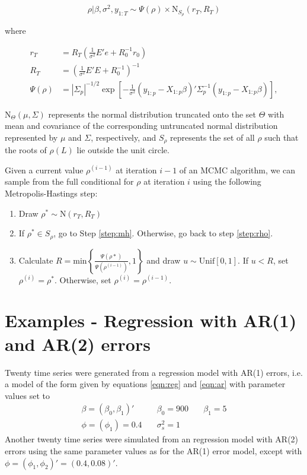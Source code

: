 \documentclass{article}
\begin{document}
\begin{equation}
\rho | \beta, \sigma^2, y_{1:T} \sim \Psi(\rho) \times \mbox{N}_{S_{\rho}}(r_T,R_T) \label{eqn:fullcondrho}
\end{equation}

\noindent where

\begin{align*}
r_T &= R_T(\frac{1}{\sigma^2}E'e + R_0^{-1}r_0) \\
R_T &= (\frac{1}{\sigma^2}E'E + R_0^{-1})^{-1} \\
\Psi(\rho) &= |\Sigma_p|^{-1/2} \exp\left[-\frac{1}{\sigma^2}(y_{1:p} - X_{1:p}\beta)'\Sigma_p^{-1}(y_{1:p} - X_{1:p}\beta)\right],
\end{align*}

\noindent $\mbox{N}_{\Theta}(\mu,\Sigma)$ represents the normal distribution truncated onto the set $\Theta$ with mean and covariance of the corresponding untruncated normal distribution represented by $\mu$ and $\Sigma$, respectively, and $S_{\rho}$ represents the set of all $\rho$ such that the roots of $\rho(L)$ lie outside the unit circle.

Given a current value $\rho^{(i-1)}$ at iteration $i-1$ of an MCMC algorithm, we can sample from the full conditional for $\rho$ at iteration $i$ using the following Metropolis-Hastings step:
\begin{enumerate}
\item Draw $\rho^* \sim \mbox{N}(r_T,R_T)$ \label{step:rho}
\item If $\rho^* \in S_{\rho}$, go to Step \ref{step:mh}. Otherwise, go back to step \ref{step:rho}.
\item Calculate $R = \mbox{min}\left\{\frac{\Psi(\rho*)}{\Psi(\rho^{(i-1)})}, 1\right\}$ and draw $u \sim \mbox{Unif}[0,1]$. If $u < R$, set $\rho^{(i)} = \rho^*$. Otherwise, set $\rho^{(i)} = \rho^{(i-1)}$. \label{step:mh}
\end{enumerate}

\section{Examples - Regression with AR(1) and AR(2) errors} \label{sec:ex}

Twenty time series were generated from a regression model with AR(1) errors, i.e. a model of the form given by equations \eqref{eqn:reg} and \eqref{eqn:ar} with parameter values set to
\begin{align*}
\beta = (\beta_0,\beta_1)' &\quad \beta_0 = 900 &\quad \beta_1 = 5 \\
\phi = (\phi_1) = 0.4 &\quad \sigma_s^2 = 1
\end{align*}
Another twenty time series were simulated from an regression model with AR(2) errors using the same parameter values as for the AR(1) error model, except with $\phi = (\phi_1,\phi_2)' = (0.4, 0.08)'$.
\end{document}
